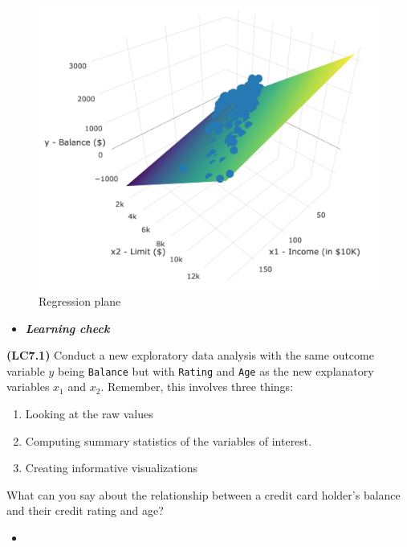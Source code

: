 \documentclass[12pt,]{krantz}
\providecommand{\tightlist}{%
  \setlength{\itemsep}{0pt}\setlength{\parskip}{0pt}}
\newenvironment{rmdblock}[1]
  {\begin{shaded*}
  \begin{itemize}
  \renewcommand{\labelitemi}{
    \raisebox{-.7\height}[0pt][0pt]{
    }
  }
  \item
  }
  {
  \end{itemize}
  \end{shaded*}
  }
\newenvironment{learncheck}
  {\begin{rmdblock}{warning}}
  {\end{rmdblock}}
\theoremstyle{definition}
\theoremstyle{definition}
\theoremstyle{definition}
\theoremstyle{remark}
\begin{document}
\begin{figure}

{\centering \includegraphics[width=\textwidth]{images/credit_card_balance_regression_plane} 

}

\caption{Regression plane}\label{fig:unnamed-chunk-228}
\end{figure}

\begin{learncheck}
\textbf{\emph{Learning check}}
\end{learncheck}

\textbf{(LC7.1)} Conduct a new exploratory data analysis with the same
outcome variable \(y\) being \texttt{Balance} but with \texttt{Rating}
and \texttt{Age} as the new explanatory variables \(x_1\) and \(x_2\).
Remember, this involves three things:

\begin{enumerate}
\def\labelenumi{\alph{enumi})}
\tightlist
\item
  Looking at the raw values
\item
  Computing summary statistics of the variables of interest.
\item
  Creating informative visualizations
\end{enumerate}

What can you say about the relationship between a credit card holder's
balance and their credit rating and age?

\begin{learncheck}

\end{learncheck}
\end{document}
